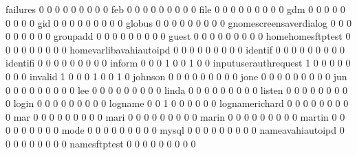 \documentclass[compress,8pt]{beamer}
\begin{document}
\begin{frame}
\begin{Schunk}
  failures                                   0   0   0   0   0   0   0   0   0
  feb                                        0   0   0   0   0   0   0   0   0
  file                                       0   0   0   0   0   0   0   0   0
  gdm                                        0   0   0   0   0   0   0   0   0
  gid                                        0   0   0   0   0   0   0   0   0
  globus                                     0   0   0   0   0   0   0   0   0
  gnomescreensaverdialog                     0   0   0   0   0   0   0   0   0
  groupadd                                   0   0   0   0   0   0   0   0   0
  guest                                      0   0   0   0   0   0   0   0   0
  homehomesftptest                           0   0   0   0   0   0   0   0   0
  homevarlibavahiautoipd                     0   0   0   0   0   0   0   0   0
  identif                                    0   0   0   0   0   0   0   0   0
  identifi                                   0   0   0   0   0   0   0   0   0
  inform                                     0   0   0   1   0   0   1   0   0
  inputuserauthrequest                       1   0   0   0   0   0   0   0   0
  invalid                                    1   0   0   0   1   0   0   1   0
  johnson                                    0   0   0   0   0   0   0   0   0
  jone                                       0   0   0   0   0   0   0   0   0
  jun                                        0   0   0   0   0   0   0   0   0
  lee                                        0   0   0   0   0   0   0   0   0
  linda                                      0   0   0   0   0   0   0   0   0
  listen                                     0   0   0   0   0   0   0   0   0
  login                                      0   0   0   0   0   0   0   0   0
  logname                                    0   0   1   0   0   0   0   0   0
  lognamerichard                             0   0   0   0   0   0   0   0   0
  mar                                        0   0   0   0   0   0   0   0   0
  mari                                       0   0   0   0   0   0   0   0   0
  marin                                      0   0   0   0   0   0   0   0   0
  martin                                     0   0   0   0   0   0   0   0   0
  mode                                       0   0   0   0   0   0   0   0   0
  mysql                                      0   0   0   0   0   0   0   0   0
  nameavahiautoipd                           0   0   0   0   0   0   0   0   0
  namesftptest                               0   0   0   0   0   0   0   0   0

\end{Schunk}
\end{frame}
\end{document}
